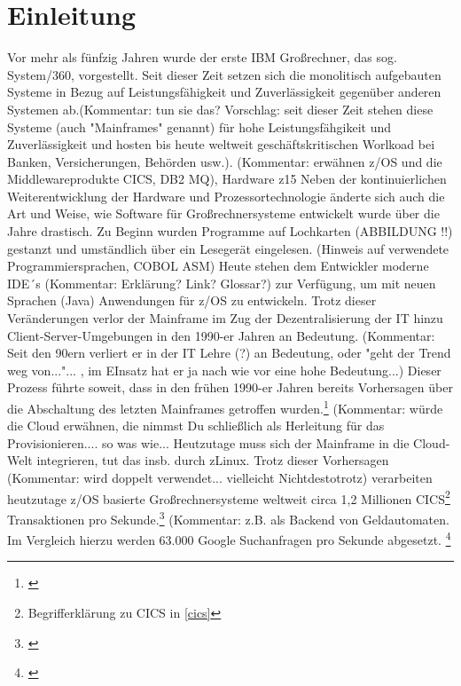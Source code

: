 \chapter{Einleitung}\label{ch:einleitung}
Vor mehr als fünfzig Jahren wurde der erste IBM Großrechner, das sog. System/360, vorgestellt.
Seit dieser Zeit setzen sich die monolitisch aufgebauten Systeme in Bezug auf Leistungsfähigkeit und Zuverlässigkeit gegenüber
anderen Systemen ab.(Kommentar: tun sie das? Vorschlag: seit dieser Zeit stehen diese Systeme (auch "Mainframes" genannt) für hohe
Leistungsfähgikeit und Zuverlässigkeit und hosten bis heute weltweit geschäftskritischen Worlkoad bei Banken, Versicherungen, 
Behörden usw.). 
(Kommentar: erwähnen z/OS und die Middlewareprodukte CICS, DB2 MQ), Hardware z15
Neben der kontinuierlichen Weiterentwicklung der Hardware und Prozessortechnologie änderte sich auch die Art und  Weise, wie Software für Großrechnersysteme entwickelt wurde über die Jahre drastisch.
Zu Beginn wurden Programme auf Lochkarten (ABBILDUNG !!) gestanzt und umständlich über ein Lesegerät eingelesen.
(Hinweis auf verwendete Programmiersprachen, COBOL ASM)
Heute stehen dem Entwickler moderne IDE´s (Kommentar: Erklärung? Link? Glossar?) zur Verfügung, um mit neuen Sprachen (Java) Anwendungen
für z/OS zu entwickeln.
Trotz dieser Veränderungen verlor der Mainframe im Zug der Dezentralisierung der IT hinzu Client-Server-Umgebungen in den 1990-er Jahren an Bedeutung. 
(Kommentar: Seit den 90ern verliert er in der IT Lehre (?)  an Bedeutung, oder "geht der Trend weg von..."... , im EInsatz hat er ja nach wie vor eine hohe Bedeutung...) 
Dieser Prozess führte soweit, dass in den frühen 1990-er Jahren bereits Vorhersagen über die Abschaltung des letzten Mainframes getroffen wurden.\footnote{\cite{Alsop.1993}}
\cite{Ceruzzi.2003}
(Kommentar: würde die Cloud erwähnen, die nimmst Du schließlich als Herleitung für das Provisionieren.... so was wie...  Heutzutage muss sich der Mainframe in die Cloud-Welt integrieren, tut das insb. durch zLinux.
Trotz dieser Vorhersagen (Kommentar: wird doppelt verwendet... vielleicht Nichtdestotrotz) verarbeiten heutzutage z/OS basierte Großrechnersysteme weltweit circa 1,2 Millionen CICS\footnote{Begrifferklärung zu CICS in \ref{cics}} Transaktionen pro Sekunde.\footnote{\cite{IBM.2019}} (Kommentar:  z.B. als Backend von Geldautomaten.
Im Vergleich hierzu werden 63.000 Google Suchanfragen pro Sekunde abgesetzt. \footnote{\cite{Sullivan.2016}}

